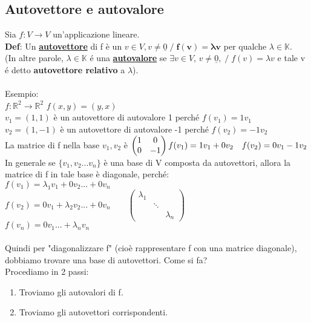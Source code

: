 \documentclass[12pt]{article}
\begin{document}
\subsection{Autovettore e autovalore}
Sia $f: V \longrightarrow V$ un'applicazione lineare.\\
\textbf{Def}: Un \textbf{\underline{autovettore}} di f è un $v \in V, v \neq \underline{0}\;/\; \boldsymbol{f(v)=\lambda v}$ per qualche $\lambda \in \mathbb{K}$.\\
(In altre parole, $\lambda \in \mathbb{K}$ é una \textbf{\underline{autovalore}} se $\exists v \in V$, $v \neq \underline{0},\;/\; f(v)=\lambda v$ e tale v é detto \textbf{autovettore relativo} a $\lambda$).\\\\
Esempio:\\
$f:\mathbb{R}^2 \longrightarrow \mathbb{R}^2$ $f(x,y)=(y,x)$\\
$v_1 = (1,1)$ è un autovettore di autovalore 1 perché $f(v_1)=1v_1$\\
$v_2 = (1,-1)$ è un autovettore di autovalore -1 perché $f(v_2) = -1v_2$\\
La matrice di f nella base $v_1,v_2$ è $\begin{pmatrix}
    1 & 0\\
    0 & -1
\end{pmatrix}
f(v_1) = 1v_1+0v_2\quad f(v_2) = 0v_1-1v_2\\\\
$
In generale se $\{v_1,v_2...v_n\}$ è una base di V composta da autovettori, allora la matrice di f in tale base è diagonale, perché:\\
$f(v_1)=\lambda_1v_1+0v_2...+0v_n$\\
$f(v_2)=0v_1+\lambda_2v_2...+0v_n \quad \quad\begin{pmatrix}
    \lambda_1 & & \\
    & \ddots &\\
    & & \lambda_n
\end{pmatrix}$\\
$f(v_n)=0v_1...+\lambda_nv_n$\\\\
Quindi per "diagonalizzare f" (cioè rappresentare f con una matrice diagonale), dobbiamo trovare una base di autovettori. Come si fa?\\
Procediamo in 2 passi:
\begin{enumerate}
    \item Troviamo gli autovalori di f.
    \item Troviamo gli autovettori corrispondenti.
\end{enumerate}
\end{document}
